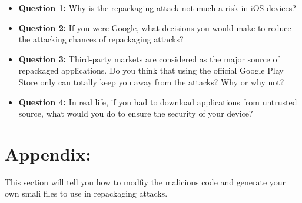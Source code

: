 \begin{itemize} 
\item \textbf{Question 1:}  Why is the repackaging attack not much a risk in iOS
  devices? 
\item \textbf{Question 2:}  If you were Google, what decisions you would make to reduce 
  the attacking chances of repackaging attacks? 
  
\item  \textbf{Question 3:}   Third-party markets are considered as the major source
  of repackaged applications. Do you think that using the official Google Play Store only can
  totally keep you away from the attacks?
  Why or why not? 

\item  \textbf{Question 4:} In real life, if you had to download applications from
  untrusted source, what would you do to ensure the security of your device? 
  
\end{itemize} 
  



\section{Appendix: }

This section will tell you how to modfiy the malicious code and generate your own smali files
to use in repackaging attacks. 

